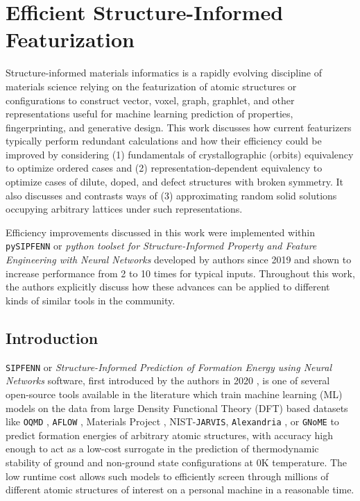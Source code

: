 
\chapter{Efficient Structure-Informed Featurization} \label{chap:pysipfenn}

Structure-informed materials informatics is a rapidly evolving discipline of materials science relying on the featurization of atomic structures or configurations to construct vector, voxel, graph, graphlet, and other representations useful for machine learning prediction of properties, fingerprinting, and generative design. This work discusses how current featurizers typically perform redundant calculations and how their efficiency could be improved by considering (1) fundamentals of crystallographic (orbits) equivalency to optimize ordered cases and (2) representation-dependent equivalency to optimize cases of dilute, doped, and defect structures with broken symmetry. It also discusses and contrasts ways of (3) approximating random solid solutions occupying arbitrary lattices under such representations.

Efficiency improvements discussed in this work were implemented within \texttt{pySIPFENN} or \textit{python toolset for Structure-Informed Property and Feature Engineering with Neural Networks} developed by authors since 2019 and shown to increase performance from 2 to 10 times for typical inputs. Throughout this work, the authors explicitly discuss how these advances can be applied to different kinds of similar tools in the community.

\section{Introduction} \label{pysipfenn:sec:Introduction}

\texttt{SIPFENN} or \textit{Structure-Informed Prediction of Formation Energy using Neural Networks} software, first introduced by the authors in 2020 \cite{Krajewski2022ExtensibleNetworks, Krajewski2020SIPFENNModels}, is one of several open-source tools available in the literature \cite{Ward2017, Jha2019IRNet, Chen2019GraphCrystals, Choudhary2021AtomisticPredictions, Deng2023CHGNetModelling, Davariashtiyani2023FormationRepresentation, Davariashtiyani2023FormationRepresentation, Schmidt2023Machine-Learning-AssistedMaterials} which train machine learning (ML) models on the data from large Density Functional Theory (DFT) based datasets like \texttt{OQMD} \cite{Saal2013MaterialsOQMD, Kirklin2015TheEnergies, Shen2022ReflectionsOQMD}, \texttt{AFLOW} \cite{Curtarolo2013AFLOW:Discovery, Toher2018TheDiscovery}, Materials Project \cite{Jain2013Commentary:Innovation}, NIST-\texttt{JARVIS}\cite{Choudhary2020TheDesign}, \texttt{Alexandria} \cite{Schmidt2022AFunctionals}, or \texttt{GNoME} \cite{Merchant2023ScalingDiscovery} to predict formation energies of arbitrary atomic structures, with accuracy high enough to act as a low-cost surrogate in the prediction of thermodynamic stability of ground and non-ground state configurations at 0K temperature. The low runtime cost allows such models to efficiently screen through millions of different atomic structures of interest on a personal machine in a reasonable time. 

